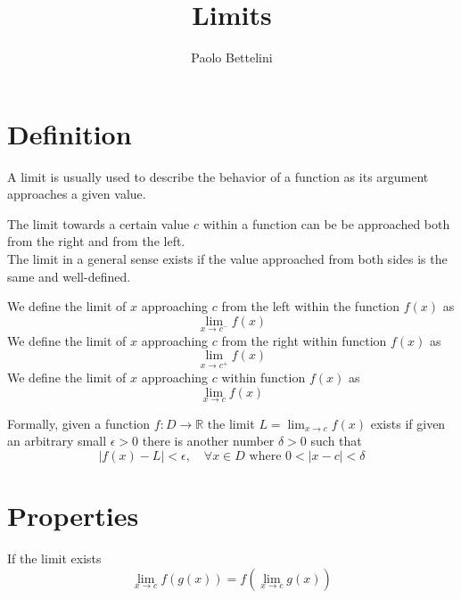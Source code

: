 \documentclass{article}
\title{Limits}
\author{Paolo Bettelini}
\date{}
\begin{document}
\maketitle
\tableofcontents
\pagebreak

\section{Definition}

A limit is usually used to describe the behavior of a function as its argument approaches a given value.

The limit towards a certain value \(c\) within a function can be be approached both from the right and from the left. \\
The limit in a general sense exists if the value approached from both sides is the same and well-defined.

We define the limit of \(x\) approaching \(c\) from the left within the function \(f(x)\) as
\[
    \lim_{x\to c^{-}}f(x)
\]
We define the limit of \(x\) approaching \(c\) from the right within function \(f(x)\) as
\[
    \lim_{x\to c^{+}}f(x)
\]
We define the limit of \(x\) approaching \(c\) within function \(f(x)\) as
\[
    \lim_{x\to c}f(x)
\]

Formally, given a function \(f:D\to \mathbb{R}\) the limit \(L=\lim_{x\to c}f(x)\) exists if given an arbitrary small \(\epsilon >0\) there is another number \(\delta >0\) such that
\[
    |f(x)-L|<\epsilon,\quad
    \forall x\in D \text{ where } 0<|x-c|<\delta
\]

\section{Properties}

If the limit exists
\[
    \lim_{x\to c}f(g(x))=f(\lim_{x\to c}g(x))
\]

\pagebreak
\end{document}
